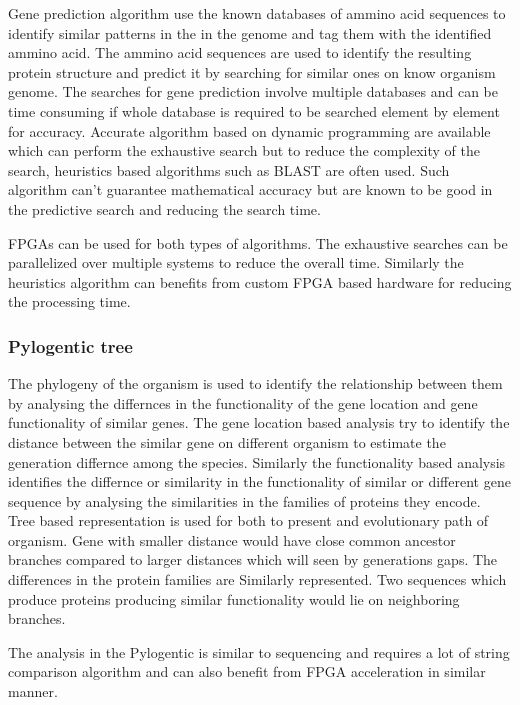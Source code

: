 \documentclass[12pt,twoside]{article}
\begin{document}
Gene prediction algorithm use the known databases of ammino acid sequences to identify similar patterns in the
in the genome and tag them with the identified ammino acid. The ammino acid sequences are used to identify
the resulting protein structure and predict it by searching for similar ones on know organism genome. The searches
for gene prediction involve multiple databases and can be time consuming if whole database is required to be
searched element by element for accuracy. Accurate algorithm based on dynamic programming are available which
can perform the exhaustive search but to reduce the complexity of the search, heuristics based algorithms
such as BLAST \cite{altschul_basic_1990} are often used. Such algorithm can't guarantee mathematical accuracy
but are known to be good in the predictive search and reducing the search time.

FPGAs can be used for both types of algorithms. The exhaustive searches can be parallelized over multiple systems
to reduce the overall time. Similarly the heuristics algorithm can benefits from custom FPGA based hardware for
reducing the processing time.

\subsubsection{Pylogentic tree}

The phylogeny of the organism is used to identify the relationship between them by analysing the differnces in the
functionality of the gene location and gene functionality of similar genes. The gene location based analysis try
to identify the distance between the similar gene on different organism to estimate the generation differnce among the
species. Similarly the functionality based analysis identifies the differnce or similarity in the functionality of
similar or different gene sequence by analysing the similarities in the families of proteins they encode.
Tree based representation is used for both to
present and evolutionary path of organism. Gene with smaller distance would have close common ancestor branches compared to
larger distances which will seen by generations gaps. The differences in the protein families are Similarly represented.
Two sequences which produce proteins producing similar functionality would lie on neighboring branches.

The analysis in the Pylogentic is similar to sequencing and requires a lot of string comparison algorithm and can also
benefit from FPGA acceleration in similar manner.
\end{document}
